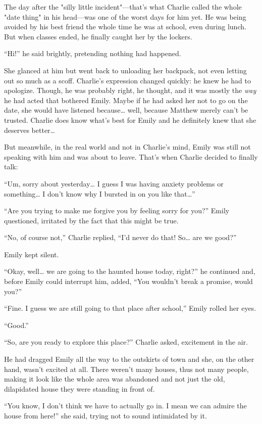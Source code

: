 The day after the "silly little incident"—that’s what Charlie called the whole "date thing" in his head—was one of the worst days for him yet. He was being avoided by his best friend the whole time he was at school, even during lunch. But when classes ended, he finally caught her by the lockers.

“Hi!” he said brightly, pretending nothing had happened.

She glanced at him but went back to unloading her backpack, not even letting out so much as a scoff. Charlie’s expression changed quickly: he knew he had to apologize. Though, he was probably right, he thought, and it was mostly the \textit{way} he had acted that bothered Emily. Maybe if he had asked her not to go on the date, she would have listened because… well, because Matthew merely can’t be trusted. Charlie does know what’s best for Emily and he definitely knew that she deserves better…

But meanwhile, in the real world and not in Charlie’s mind, Emily was still not speaking with him and was about to leave. That’s when Charlie decided to finally talk:

“Um, sorry about yesterday… I guess I was having anxiety problems or something… I don’t know why I bursted in on you like that…”

“Are you trying to make me forgive you by feeling sorry for you?” Emily questioned, irritated by the fact that this might be true.

“No, of course not,” Charlie replied, “I’d never do that! So… are we good?”

Emily kept silent.

“Okay, well… we are going to the haunted house today, right?” he continued and, before Emily could interrupt him, added, “You wouldn’t break a promise, would you?”

“Fine. I guess we are still going to that place after school,” Emily rolled her eyes.

“Good.”

\bigskip

“So, are you ready to explore this place?” Charlie asked, excitement in the air.

He had dragged Emily all the way to the outskirts of town and she, on the other hand, wasn’t excited at all. There weren’t many houses, thus not many people, making it look like the whole area was abandoned and not just the old, dilapidated house they were standing in front of.

“You know, I don’t think we have to actually go in. I mean we can admire the house from here!” she said, trying not to sound intimidated by it.

